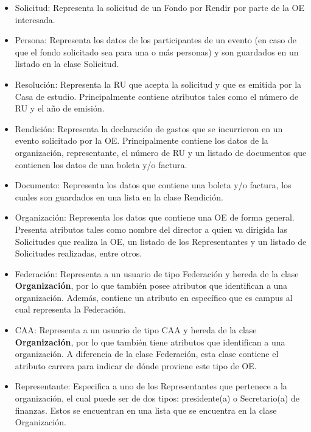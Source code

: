\begin{itemize}
    \item Solicitud: Representa la solicitud de un Fondo por Rendir por parte de la OE interesada.
    \item Persona: Representa los datos de los participantes de un evento (en caso de que el fondo solicitado sea para una o más personas) y son guardados en un listado en la clase Solicitud.
    \item Resolución: Representa la RU que acepta la solicitud y que es emitida por la Casa de estudio. Principalmente contiene atributos tales como el número de RU y el año de emisión.
    \item Rendición: Representa la declaración de gastos que se incurrieron en un evento solicitado por la OE. Principalmente contiene los datos de la organización, representante, el número de RU y un listado de documentos que contienen los datos de una boleta y/o factura. 
    \item Documento: Representa los datos que contiene una boleta y/o factura, los cuales son guardados en una lista en la clase Rendición.
    \item Organización: Representa los datos que contiene una OE de forma general. Presenta atributos tales como nombre del director a quien va dirigida las Solicitudes que realiza la OE, un listado de los Representantes y un listado de Solicitudes realizadas, entre otros.
    \item Federación: Representa a un usuario de tipo Federación y hereda de la clase \textbf{Organización}, por lo que también posee atributos que identifican a una organización. Además, contiene un atributo en específico que es campus al cual representa la Federación.
    \item CAA: Representa a un usuario de tipo CAA y hereda de la clase \textbf{Organización}, por lo que también tiene atributos que identifican a una organización. A diferencia de la clase Federación, esta clase contiene el atributo carrera para indicar de dónde proviene este tipo de OE.
    \item Representante: Especifica a uno de los Representantes que pertenece a la organización, el cual puede ser de dos tipos: presidente(a) o Secretario(a) de finanzas. Estos se encuentran en una lista que se encuentra en la clase Organización.
\end{itemize}


